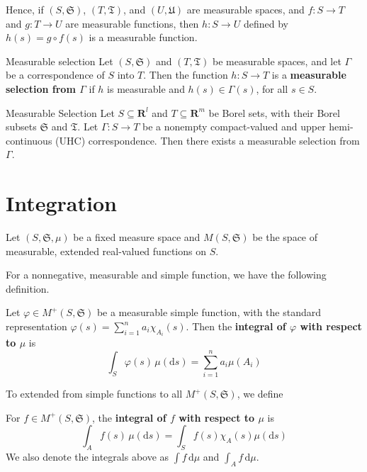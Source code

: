 Hence, if $(S, \mathfrak{S})$, $(T, \mathfrak{T})$, and $(U, \mathfrak{U})$ are measurable spaces, and $f : S \longrightarrow T$ and $g : T \longrightarrow U$ are measurable functions, then $h : S \longrightarrow U$ defined by $h(s) = g \circ f(s)$ is a measurable function.

\begin{definition}[]{Measurable selection}{}
	Let $(S, \mathfrak{S})$ and $(T, \mathfrak{T})$ be measurable spaces, and let $\Gamma$ be a correspondence of $S$ into $T$. Then the function $h : S \longrightarrow T$ is a \textbf{measurable selection from $\Gamma$} if $h$ is measurable and $h(s) \in \Gamma(s)$, for all $s \in S$.
\end{definition}

\begin{theorem}[]{Measurable Selection}{}
	Let $S \subseteq \textbf{R}^l$ and $T \subseteq \textbf{R}^m$ be Borel sets, with their Borel subsets $\mathfrak{S}$ and $\mathfrak{T}$. Let $\Gamma : S \longrightarrow T$ be a nonempty compact-valued and upper hemi-continuous (UHC) correspondence. Then there exists a measurable selection from $\Gamma$.
\end{theorem}

\section{Integration}

Let $(S, \mathfrak{S}, \mu)$ be a fixed measure space and $M(S, \mathfrak{S})$ be the space of measurable, extended real-valued functions on $S$. 

For a nonnegative, measurable and simple function, we have the following definition.

\begin{definition}[]{}{}
	Let $\varphi \in M^+(S, \mathfrak{S})$ be a measurable simple function, with the standard representation $\varphi(s) = \sum_{i=1}^n a_i \chi_{A_i}(s)$. Then the \textbf{integral of $\varphi$ with respect to $\mu$} is 
	\[
		\int_S \varphi(s) \, \mu(\mathrm{d} s) = \sum_{i=1}^n a_i \mu(A_i)
	\]
\end{definition}

To extended from simple functions to all $M^+(S, \mathfrak{S})$, we define

\begin{definition}[]{}{}
	For $f \in M^+(S, \mathfrak{S})$, the \textbf{integral of $f$ with respect to $\mu$} is 
	\[
		\int_A f(s) \, \mu(\mathrm{d}s) = \int_S f(s) \chi_A (s) \mu(\mathrm{d}s)
	\]
	We also denote the integrals above as $\int f \, \mathrm{d} \mu$ and $\int_A f \, \mathrm{d} \mu$. 
\end{definition}

